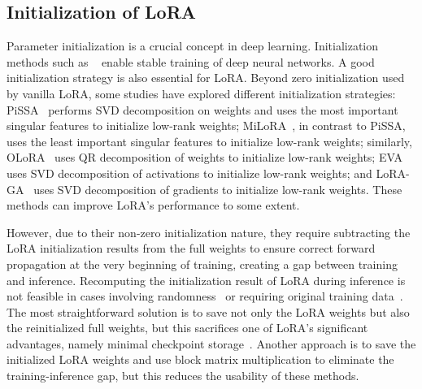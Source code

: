 \subsection{Initialization of LoRA}
Parameter initialization is a crucial concept in deep learning. Initialization methods such as ~\citep{glorot2010understanding} enable stable training of deep neural networks. A good initialization strategy is also essential for LoRA. Beyond zero initialization used by vanilla LoRA, some studies have explored different initialization strategies: PiSSA~\citep{meng2024pissa} performs SVD decomposition on weights and uses the most important singular features to initialize low-rank weights; MiLoRA~\citep{wang2024milora}, in contrast to PiSSA, uses the least important singular features to initialize low-rank weights; similarly, OLoRA~\citep{buyukakyuz2024olora} uses QR decomposition of weights to initialize low-rank weights; EVA~\citep{paischer2024eva} uses SVD decomposition of activations to initialize low-rank weights; and LoRA-GA~\citep{wang2024lora-ga} uses SVD decomposition of gradients to initialize low-rank weights. These methods can improve LoRA's performance to some extent. 

However, due to their non-zero initialization nature, they require subtracting the LoRA initialization results from the full weights to ensure correct forward propagation at the very beginning of training, creating a gap between training and inference. Recomputing the initialization result of LoRA during inference is not feasible in cases involving randomness~\citep{meng2024pissa} or requiring original training data~\citep{wang2024lora-ga, paischer2024eva}. The most straightforward solution is to save not only the LoRA weights but also the reinitialized full weights, but this sacrifices one of LoRA's significant advantages, namely minimal checkpoint storage~\citep{fomenko2024note}. Another approach is to save the initialized LoRA weights and use block matrix multiplication to eliminate the training-inference gap, but this reduces the usability of these methods.



